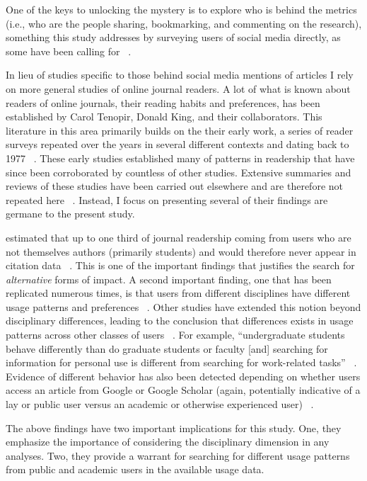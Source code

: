 One of the keys to unlocking the mystery is to explore who is behind the metrics (i.e., who are the people sharing, bookmarking, and commenting on the research), something this study addresses by surveying users of social media directly, as some have been calling for ~\citep{Haustein2014b}.

In lieu of studies specific to those behind social media mentions of articles I rely on more general studies of online journal readers. A lot of what is known about readers of online journals, their reading habits and preferences, has been established by Carol Tenopir, Donald King, and their collaborators. This literature in this area primarily builds on the their early work, a series of reader surveys repeated over the years in several different contexts and dating back to 1977 ~\citep{Tenopir2000,Tenopir2009,Tenopir2010}. These early studies established many of patterns in readership that have since been corroborated by countless of other studies. Extensive summaries and reviews of these studies have been carried out elsewhere and are therefore not repeated here ~\citep{Tenopir2003,Rowlands2007b}. Instead, I focus on presenting several of their findings are germane to the present study.

 \citet{Tenopir2000} estimated that up to one third of journal readership coming from users who are not themselves authors (primarily students) and would therefore never appear in citation data ~\citep{Tenopir2000}. This is one of the important findings that justifies the search for \emph{alternative} forms of impact. A second important finding, one that has been replicated numerous times, is that users from different disciplines have different usage patterns and preferences ~\citep{Tenopir2000,Talja2003,Fry2004}. Other studies have extended this notion beyond disciplinary differences, leading to the conclusion that differences exists in usage patterns across other classes of users ~\citep{Tenopir2003,Fry2004}. For example, ``undergraduate students behave differently than do graduate students or faculty [and] searching for information for personal use is different from searching for work-related tasks'' ~\citep[p. 28]{Tenopir2003}. Evidence of different behavior has also been detected depending on whether users access an article from Google or Google Scholar (again, potentially indicative of a lay or public user versus an academic or otherwise experienced user) ~\citep{Kurtz2010}.

The above findings have two important implications for this study. One, they emphasize the importance of considering the disciplinary dimension in any analyses. Two, they provide a warrant for searching for different usage patterns from public and academic users in the available usage data.

